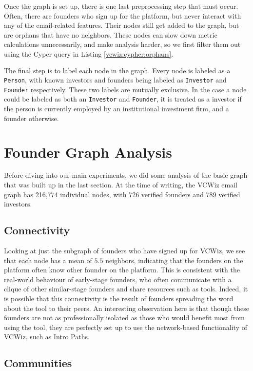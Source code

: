Once the graph is set up, there is one last preprocessing step that must occur. Often, there are founders who sign up for the platform, but never interact with any of the email-related features. Their nodes still get added to the graph, but are orphans that have no neighbors. These nodes can slow down metric calculations unnecessarily, and make analysis harder, so we first filter them out using the Cyper query in Listing \ref{vcwiz:cypher:orphans}.

The final step is to label each node in the graph. Every node is labeled as a \texttt{Person}, with known investors and founders being labeled as \texttt{Investor} and \texttt{Founder} respectively. These two labels are mutually exclusive. In the case a node could be labeled as both an \texttt{Investor} and \texttt{Founder}, it is treated as a investor if the person is currently employed by an institutional investment firm, and a founder otherwise.

\section{Founder Graph Analysis}

Before diving into our main experiments, we did some analysis of the basic graph that was built up in the last section. At the time of writing, the VCWiz email graph has 216,774 individual nodes, with 726 verified founders and 789 verified investors.

\subsection{Connectivity}

Looking at just the subgraph of founders who have signed up for VCWiz, we see that each node has a mean of $5.5$ neighbors, indicating that the founders on the platform often know other founder on the platform. This is consistent with the real-world behaviour of early-stage founders, who often communicate with a clique of other similar-stage founders and share resources such as tools. Indeed, it is possible that this connectivity is the result of founders spreading the word about the tool to their peers. An interesting observation here is that though these founders are not as professionally isolated as those who would benefit most from using the tool, they are perfectly set up to use the network-based functionality of VCWiz, such as Intro Paths.

\subsection{Communities}

